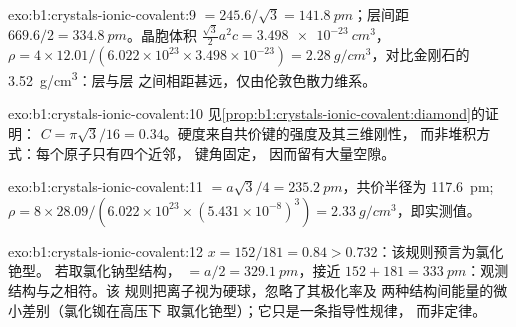 \begin{solution}{exo:b1:crystals-ionic-covalent:9}
 $= 245.6/\sqrt3 = \qty{141.8}{pm}$；层间距 $669.6/2 =
\qty{334.8}{pm}$。晶胞体积 $\frac{\sqrt3}{2}a^2c = \qty{3.498e-23}{cm^3}$，
$\rho = 4 \times 12.01/(6.022 \times 10^{23} \times 3.498 \times 10^{-23})
= \qty{2.28}{g/cm^3}$，对比金刚石的 \qty{3.52}{g/cm^3}：层与层
之间相距甚远，仅由伦敦色散力维系。
\end{solution}

\begin{solution}{exo:b1:crystals-ionic-covalent:10}
见\cref{prop:b1:crystals-ionic-covalent:diamond}的证明：
$C = \pi\sqrt3/16 = 0.34$。硬度来自共价键的强度及其三维刚性，
而非堆积方式：每个原子只有四个近邻，
键角固定，
因而留有大量空隙。
\end{solution}

\begin{solution}{exo:b1:crystals-ionic-covalent:11}
 $= a\sqrt3/4 = \qty{235.2}{pm}$，共价半径为
\qty{117.6}{pm}; $\rho = 8 \times 28.09/(6.022 \times 10^{23} \times
(5.431 \times 10^{-8})^3) = \qty{2.33}{g/cm^3}$，即实测值。
\end{solution}

\begin{solution}{exo:b1:crystals-ionic-covalent:12}
$x = 152/181 = 0.84 > 0.732$：该规则预言为氯化铯型。
若取氯化钠型结构， $= a/2 = \qty{329.1}{pm}$，接近
$152 + 181 = \qty{333}{pm}$：观测结构与之相符。该
规则把离子视为硬球，忽略了其极化率及
两种结构间能量的微小差别（氯化铷在高压下
取氯化铯型）；它只是一条指导性规律，
而非定律。
\end{solution}

